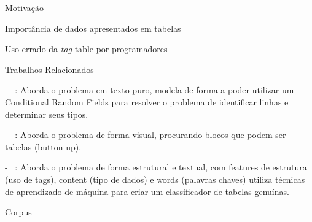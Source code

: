 \documentclass{beamer}
\newenvironment{my_itemize}{
\begin{itemize}
  \setlength{\itemsep}{5pt}
  \setlength{\parskip}{2pt}
  \setlength{\parsep}{3pt}
}{\end{itemize}}
\begin{document}
\begin{frame}[allowframebreaks]
\begin{my_itemize}
\newpage
    \item Motivação
    \begin{my_itemize}
    \item Importância de dados apresentados em tabelas
    \item Uso errado da \textit{tag} table por programadores
    \end{my_itemize}

    \item {\color{yellow}Trabalhos Relacionados}
    \begin{my_itemize}
    \item[-] ~\cite{Pinto2003}: Aborda o problema em texto puro, modela de forma a poder utilizar um Conditional Random Fields para resolver o problema de identificar linhas e determinar seus tipos.

   \item[-] ~\cite{Krupl2006}: Aborda o problema de forma visual, procurando blocos que podem ser tabelas (button-up).

   \item[-] ~\cite{Wang2002}: Aborda o problema de forma estrutural e textual, com features de estrutura (uso de tags), content (tipo de dados) e words (palavras chaves) utiliza técnicas de aprendizado de máquina para criar um classificador de tabelas genuínas.

   \end{my_itemize}




    \item {\color{yellow}Corpus}

  \end{my_itemize}
\end{frame}
\end{document}
